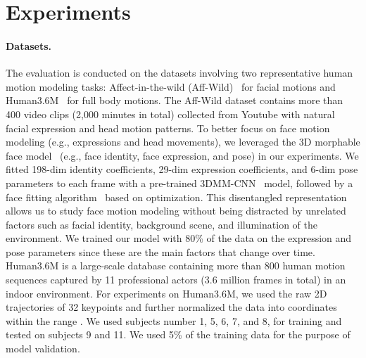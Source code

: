 \documentclass[runningheads]{llncs}
\newcommand{\cutsectionup}{\vspace*{-0.2in}}
\newcommand{\cutsectiondown}{\vspace*{-0.12in}}
\begin{document}
\cutsectionup
\section{Experiments}
\cutsectiondown

\paragraph{Datasets.} The evaluation is conducted on the datasets involving two representative human motion modeling tasks: Affect-in-the-wild  (Aff-Wild)~\cite{zafeiriou2017aff} for facial motions and Human3.6M~\cite{ionescu2014human3} for full body motions.
The Aff-Wild dataset contains more than 400 video clips (2,000 minutes in total) collected from Youtube with natural facial expression and head motion patterns.
To better focus on face motion modeling (e.g., expressions and head movements), we leveraged the 3D morphable face model~\cite{bfm09,blanz1999morphable} (e.g., face identity, face expression, and pose) in our experiments.
We fitted 198-dim identity coefficients, 29-dim expression coefficients, and 6-dim pose parameters to each frame with a pre-trained 3DMM-CNN~\cite{tran2017regressing} model, followed by a face fitting algorithm~\cite{zhu2016face} based on optimization.
This disentangled representation allows us to study face motion modeling without being distracted by unrelated factors such as facial identity, background scene, and illumination of the environment.
We trained our model with 80\% of the data on the expression and pose parameters since these are the main factors that change over time.
Human3.6M is a large-scale database containing more than 800 human motion sequences captured by 11 professional actors (3.6 million frames in total) in an indoor environment.
For experiments on Human3.6M, we used the raw 2D trajectories of 32 keypoints and further normalized the data into coordinates within the range .
We used subjects number 1, 5, 6, 7, and 8, for training and tested on subjects 9 and 11.
We used 5\% of the training data for the purpose of model validation.
\end{document}
